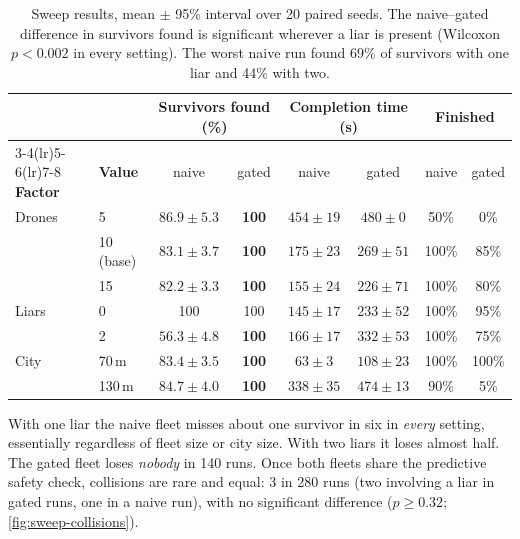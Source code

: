 \begin{table}[!htbp]
\centering
\renewcommand{\arraystretch}{1.18}
\begin{tabular}{@{}l l c c c c c c@{}}
\toprule
 & & \multicolumn{2}{c}{\textbf{Survivors found (\%)}} & \multicolumn{2}{c}{\textbf{Completion time (s)}} &
 \multicolumn{2}{c}{\textbf{Finished}} \\
\cmidrule(lr){3-4}\cmidrule(lr){5-6}\cmidrule(lr){7-8}
\textbf{Factor} & \textbf{Value} & naive & gated & naive & gated & naive & gated \\
\midrule
Drones   & 5           & $86.9\pm5.3$ & \textbf{100} & $454\pm19$ & $480\pm0$  & 50\%  & 0\% \\
         & 10 (base)   & $83.1\pm3.7$ & \textbf{100} & $175\pm23$ & $269\pm51$ & 100\% & 85\% \\
         & 15          & $82.2\pm3.3$ & \textbf{100} & $155\pm24$ & $226\pm71$ & 100\% & 80\% \\
\midrule
Liars    & 0           & 100          & 100          & $145\pm17$ & $233\pm52$ & 100\% & 95\% \\
         & 2           & $56.3\pm4.8$ & \textbf{100} & $166\pm17$ & $332\pm53$ & 100\% & 75\% \\
\midrule
City     & 70\,m       & $83.4\pm3.5$ & \textbf{100} & $63\pm3$   & $108\pm23$ & 100\% & 100\% \\
         & 130\,m      & $84.7\pm4.0$ & \textbf{100} & $338\pm35$ & $474\pm13$ & 90\%  & 5\% \\
\bottomrule
\end{tabular}
\caption[Sweep results]{Sweep results, mean $\pm$ 95\% interval over 20 paired seeds. The naive--gated difference
in survivors found is significant wherever a liar is present (Wilcoxon $p<0.002$ in every setting). The worst naive
run found 69\% of survivors with one liar and 44\% with two.}
\label{tab:sweep}
\end{table}

\begin{findingbox}
With one liar the naive fleet misses about one survivor in six in \emph{every} setting, essentially regardless of fleet
size or city size. With two liars it loses almost half. The gated fleet loses \emph{nobody} in 140 runs. Once both
fleets share the predictive safety check, collisions are rare and equal: 3 in 280 runs (two involving a liar in gated
runs, one in a naive run), with no significant difference ($p\ge0.32$; \autoref{fig:sweep-collisions}).
\end{findingbox}

